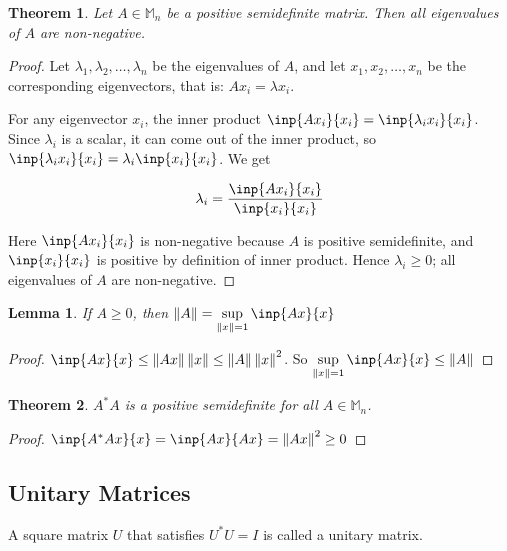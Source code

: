 \documentclass[twofold]{article}
\newcommand*\adj[1]{#1^*}
\newcommand*\norm[1]{\left \Vert #1 \right\Vert}
\theoremstyle{plain}
\newtheorem{theorem}{Theorem}
\newtheorem*{lemma}{Lemma}
\theoremstyle{definition}
\theoremstyle{remark}
\begin{document}
\begin{theorem} Let \(A \in \mathbb{M}_n\) be a positive semidefinite matrix. Then all eigenvalues of \(A\) are non-negative. \end{theorem}
\begin{proof} Let \(\lambda_1, \lambda_2, \ldots , \lambda_n\) be the eigenvalues of \(A\), and let \(x_1, x_2, \ldots , x_n\) be the corresponding eigenvectors, that is: \(Ax_i = \lambda x_i\). 

 For any eigenvector \(x_i\), the inner product \(\inp{Ax_i}{x_i} = \inp{\lambda_i x_i}{x_i}\). Since \(\lambda_i\) is a scalar, it can come out of the inner product, so  \( \inp{\lambda_i x_i}{x_i}  = \lambda_i \inp{x_i}{x_i}\). We get

\[\lambda_i = \frac{\inp{Ax_i}{x_i}}{\inp{x_i}{x_i}}\]

Here \(\inp{Ax_i}{x_i} \) is non-negative because \(A\) is positive semidefinite, and \(\inp{x_i}{x_i}\) is positive by definition of inner product. Hence \(\lambda_i \ge 0\); all eigenvalues of \(A\) are non-negative. \end{proof}


\begin{lemma} If \(A \ge 0\), then \(\displaystyle \norm{A} = \sup _{\norm{x} = 1} \inp{Ax}{x}\) \end{lemma}
\begin{proof} \(\inp{Ax}{x} \le \norm{Ax} \norm{x} \le \norm{A} \norm{x}^2\). So \(\displaystyle \sup_{\norm{x} = 1} \inp{Ax}{x} \leq \norm{A} \) \end{proof}

\begin{theorem} \(\adj{A} A\) is a positive semidefinite for all \(A \in \mathbb{M}_n\). \end{theorem}
\begin{proof} \(\inp{\adj{A} A x}{ x} = \inp{Ax}{Ax} = \norm{Ax}^2 \ge 0\)\end{proof}

\subsection{Unitary Matrices}

A square matrix \(U\) that satisfies \(\adj{U} U = I\) is called a unitary matrix.
\end{document}
